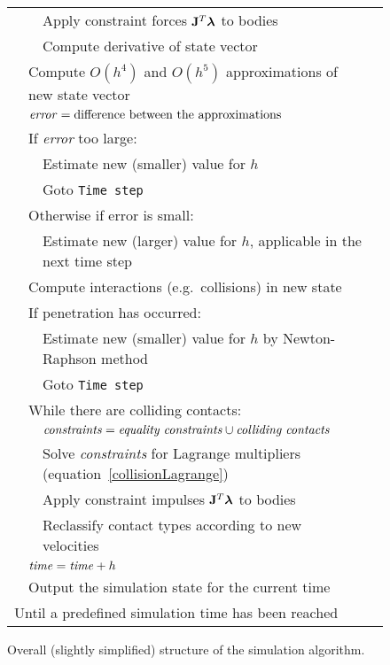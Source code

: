 \begin{figure}
\begin{tabular}{|l|l|l|l|@{}l}
        &&\multicolumn{2}{|l|}{Apply constraint forces $\m{J}^T\ve{\lambda}$ to bodies}\\\cline{3-4}
        &&\multicolumn{2}{|l|}{Compute derivative of state vector}\\\cline{2-4}
    &\multicolumn{3}{|l|}{Compute $O(h^4)$ and $O(h^5)$ approximations of new state vector}\\\cline{2-4}
    &\multicolumn{3}{|l|}{$\mbox{\textit{error}} = \mbox{difference between the approximations}$}\\\cline{2-4}
    &\multicolumn{3}{|l|}{If \textit{error} too large:}\\\cline{3-4}
        &&\multicolumn{2}{|l|}{Estimate new (smaller) value for $h$}\\\cline{3-4}
        &&\multicolumn{2}{|l|}{Goto \texttt{Time step}}\\\cline{2-4}
    &\multicolumn{3}{|l|}{Otherwise if error is small:}\\\cline{3-4}
        &&\multicolumn{2}{|l|}{Estimate new (larger) value for $h$, applicable in the next time step}\\\cline{2-4}
    &\multicolumn{3}{|l|}{Compute interactions (e.g.\ collisions) in new state}\\\cline{2-4}
    &\multicolumn{3}{|l|}{If penetration has occurred:}\\\cline{3-4}
        &&\multicolumn{2}{|l|}{Estimate new (smaller) value for $h$ by Newton-Raphson method}\\\cline{3-4}
        &&\multicolumn{2}{|l|}{Goto \texttt{Time step}}\\\cline{2-4}
    &\multicolumn{3}{|l|}{While there are colliding contacts:}\\\cline{3-4}
        &&\multicolumn{2}{|l|}{$\mbox{\textit{constraints}} = \mbox{\textit{equality constraints}}
        \cup \mbox{\textit{colliding contacts}}$}\\\cline{3-4}
        &&\multicolumn{2}{|l|}{Solve \textit{constraints} for Lagrange multipliers
        (equation~\ref{collisionLagrange})}&
        \zerobox{b}{\mbox{$\left\}\ref{collidingContact}\begin{array}{l}
        \spx\spx\spx\spx\spx\end{array}\right.$}}\\\cline{3-4}
        &&\multicolumn{2}{|l|}{Apply constraint impulses $\m{J}^T\ve{\lambda}$ to bodies}\\\cline{3-4}
        &&\multicolumn{2}{|l|}{Reclassify contact types according to new velocities}\\\cline{2-4}
    &\multicolumn{3}{|l|}{$\mbox{\textit{time}} = \mbox{\textit{time}} + h$}\\\cline{2-4}
    &\multicolumn{3}{|l|}{Output the simulation state for the current time}\\\cline{2-4}
\multicolumn{4}{|l|}{Until a predefined simulation time has been reached}\\\cline{1-4}
\end{tabular}
\caption{Overall (slightly simplified) structure of the simulation algorithm.}
\end{figure}
